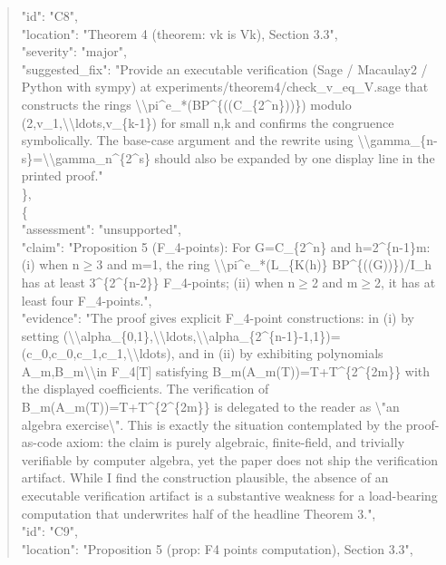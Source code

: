 \documentclass[11pt]{article}
\begin{document}
\begin{quote}
      "id": "C8",\\
      "location": "Theorem 4 (theorem: vk is Vk), Section 3.3",\\
      "severity": "major",\\
      "suggested\_fix": "Provide an executable verification (Sage / Macaulay2 / Python with sympy) at experiments/theorem4/check\_v\_eq\_V.sage that constructs the rings \textbackslash{}\textbackslash{}pi\^{}e\_*(BP\^{}\{((C\_\{2\^{}n\}))\}) modulo (2,v\_1,\textbackslash{}\textbackslash{}ldots,v\_\{k-1\}) for small n,k and confirms the congruence symbolically. The base-case argument and the rewrite using \textbackslash{}\textbackslash{}gamma\_\{n-s\}=\textbackslash{}\textbackslash{}gamma\_n\^{}\{2\^{}s\} should also be expanded by one display line in the printed proof."\\
    \},\\
    \{\\
      "assessment": "unsupported",\\
      "claim": "Proposition 5 (F\_4-points): For G=C\_\{2\^{}n\} and h=2\^{}\{n-1\}m: (i) when n\ensuremath{\ge}3 and m=1, the ring \textbackslash{}\textbackslash{}pi\^{}e\_*(L\_\{K(h)\} BP\^{}\{((G))\}<1>)/I\_h has at least 3\^{}\{2\^{}\{n-2\}\} F\_4-points; (ii) when n\ensuremath{\ge}2 and m\ensuremath{\ge}2, it has at least four F\_4-points.",\\
      "evidence": "The proof gives explicit F\_4-point constructions: in (i) by setting (\textbackslash{}\textbackslash{}alpha\_\{0,1\},\textbackslash{}\textbackslash{}ldots,\textbackslash{}\textbackslash{}alpha\_\{2\^{}\{n-1\}-1,1\})=(c\_0,c\_0,c\_1,c\_1,\textbackslash{}\textbackslash{}ldots), and in (ii) by exhibiting polynomials A\_m,B\_m\textbackslash{}\textbackslash{}in F\_4[T] satisfying B\_m(A\_m(T))=T+T\^{}\{2\^{}\{2m\}\} with the displayed coefficients. The verification of B\_m(A\_m(T))=T+T\^{}\{2\^{}\{2m\}\} is delegated to the reader as \textbackslash{}"an algebra exercise\textbackslash{}". This is exactly the situation contemplated by the proof-as-code axiom: the claim is purely algebraic, finite-field, and trivially verifiable by computer algebra, yet the paper does not ship the verification artifact. While I find the construction plausible, the absence of an executable verification artifact is a substantive weakness for a load-bearing computation that underwrites half of the headline Theorem 3.",\\
      "id": "C9",\\
      "location": "Proposition 5 (prop: F4 points computation), Section 3.3",\\

\end{quote}
\end{document}
